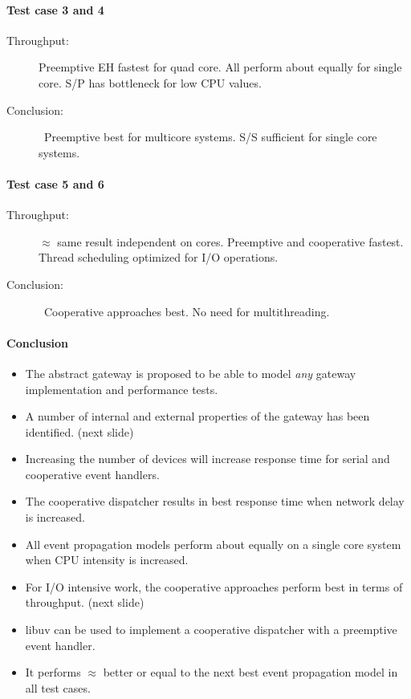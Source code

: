 \documentclass{memoir}
\begin{document}
\paragraph{Test case 3 and 4}

\begin{description}
    \item[Throughput:] Preemptive EH fastest for quad core. All perform about
        equally for single core. S/P has bottleneck for low CPU values.
    \item[Conclusion:] Preemptive best for multicore systems. S/S sufficient
        for single core systems.
\end{description}

\paragraph{Test case 5 and 6}

\begin{description}
    \item[Throughput:] $\approx$ same result independent on cores. Preemptive
        and cooperative fastest. Thread scheduling optimized for I/O
        operations.
    \item[Conclusion:] Cooperative approaches best. No need for multithreading.
\end{description}

\paragraph{Conclusion}

\begin{itemize}
    \item The abstract gateway is proposed to be able to model \textit{any}
        gateway implementation and performance tests.
    \item A number of internal and external properties of the gateway
        has been identified. (next slide)
    \item Increasing the number of devices will increase response time
        for serial and cooperative event handlers.
    \item The cooperative dispatcher results in best response time when
        network delay is increased.
    \item All event propagation models perform about equally on a
        single core system when CPU intensity is increased.
    \item For I/O intensive work, the cooperative approaches perform
        best in terms of throughput. (next slide)
    \item libuv can be used to implement a cooperative dispatcher with
        a preemptive event handler.
    \item It performs $\approx$ better or equal to the next best event
        propagation model in all test cases.
\end{itemize}
\end{document}
